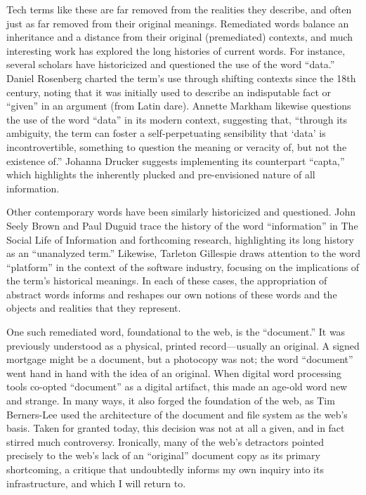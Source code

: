Tech terms like these are far removed from the realities they describe, and often just as far removed from their original meanings. Remediated words balance an inheritance and a distance from their original (premediated) contexts, and much interesting work has explored the long histories of current words. For instance, several scholars have historicized and questioned the use of the word “data.” Daniel Rosenberg charted the term’s use through shifting contexts since the 18th century, noting that it was initially used to describe an indisputable fact or “given” in an argument (from Latin dare).  Annette Markham likewise questions the use of the word “data” in its modern context, suggesting that, “through its ambiguity, the term can foster a self-perpetuating sensibility that ‘data’ is incontrovertible, something to question the meaning or veracity of, but not the existence of.”  Johanna Drucker suggests implementing its counterpart “capta,” which highlights the inherently plucked and pre-envisioned nature of all information. 

Other contemporary words have been similarly historicized and questioned. John Seely Brown and Paul Duguid trace the history of the word “information” in The Social Life of Information and forthcoming research, highlighting its long history as an “unanalyzed term.”  Likewise, Tarleton Gillespie draws attention to the word “platform” in the context of the software industry, focusing on the implications of the term’s historical meanings.  In each of these cases, the appropriation of abstract words informs and reshapes our own notions of these words and the objects and realities that they represent.

One such remediated word, foundational to the web, is the “document.” It was previously understood as a physical, printed record—usually an original. A signed mortgage might be a document, but a photocopy was not; the word “document” went hand in hand with the idea of an original. When digital word processing tools co-opted “document” as a digital artifact, this made an age-old word new and strange. In many ways, it also forged the foundation of the web, as Tim Berners-Lee used the architecture of the document and file system as the web’s basis.  Taken for granted today, this decision was not at all a given, and in fact stirred much controversy. Ironically, many of the web’s detractors pointed precisely to the web’s lack of an “original” document copy as its primary shortcoming, a critique that undoubtedly informs my own inquiry into its infrastructure, and which I will return to. 

